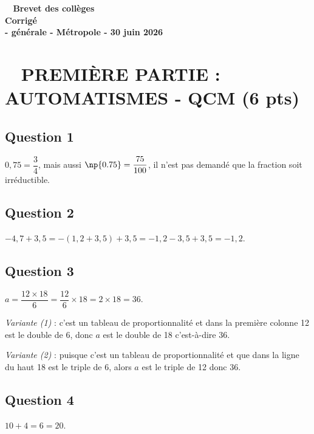\documentclass[12pt,a4paper,french]{article}
\begin{document}
\pagestyle{fancy}

\thispagestyle{empty}

\begin{center}
{\Large \textbf{\decofourleft~ Brevet des collèges ~\decofourright\\[10pt]Corrigé\\[10pt] - générale - Métropole - 30 juin 2026 }}
\end{center}


\section*{\hfill~ PREMIÈRE PARTIE : AUTOMATISMES - QCM (6 pts)\hfill~}


\subsection*{Question 1}


$0,75=\dfrac{3}{4}$, mais aussi \mbox{$\np{0.75}=\dfrac{75}{100}$}, il n'est pas demandé que la fraction soit irréductible.

\subsection*{Question 2}

$-4,7+3,5=-(1,2+3,5)+3,5=-1,2-3,5+3,5=-1,2$.
\subsection*{Question 3}


$a=\dfrac{12\times 18}{6}=\dfrac{12}{6}\times 18=2\times 18 =36$.

\textit{Variante (1)} : c'est un tableau de proportionnalité et dans la première colonne 12 est le double de 6, donc $a$ est le double de 18 c'est-à-dire 36.

\textit{Variante (2)} : puisque c'est un tableau de proportionnalité et que dans la ligne du haut 18 est le triple de 6, alors $a$ est le triple de 12 donc 36.
\subsection*{Question 4}


$10+4=6=20$.
\end{document}
